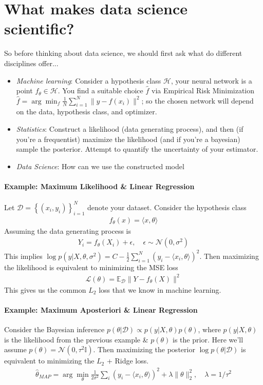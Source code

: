 \section{What makes data science scientific?}
So before thinking about data science, we should first ask what do different disciplines offer...
\begin{itemize}
	\item \emph{Machine learning}: Consider a hypothesis class $\mathcal H$, your neural network is a point $f_\theta \in \mathcal H$. You find a suitable choice $\hat f$ via Empirical Risk Minimization $\hat f = \arg \min_{f}\frac{1}{N} \sum_{i=1}^N \| y - f(x_i)\|^2$; so the chosen network will depend on the data, hypothesis class, and optimizer.
	\item \emph{Statistics}: Construct a likelihood (data generating process), and then (if you're a frequentist) maximize the likelihood (and if you're a bayesian) sample the posterior. Attempt to quantify the uncertainty of your estimator.
	\item \emph{Data Science}: How can we use the constructed model 
\end{itemize}

\paragraph{Example: Maximum Likelihood \& Linear Regression}
Let $\mathcal D = \left\{ (x_i, y_i) \right\}_{i=1}^N$ denote your dataset. Consider the hypothesis class
\begin{align}
	f_\theta(x) = \langle x , \theta\rangle
\end{align}
Assuming the data generating process is
\begin{align}
	Y_i = f_\theta(X_i) + \epsilon, \quad \epsilon \sim \mathcal N(0, \sigma^2)
\end{align}
This implies $\log p(y| X, \theta, \sigma^2) = C - \frac{1}{2} \sum_{i=1}^N(y_i - \langle x_i, \theta\rangle)^2$. Then maximizing the likelihood is equivalent to minimizing the MSE loss
\begin{align}
	\mathcal L(\theta) = \mathbb E_{\mathcal D} \| Y - f_\theta(X)\|^2
\end{align}
This gives us the common $L_2$ loss that we know in machine learning.

\paragraph{Example: Maximum Aposteriori \& Linear Regression}
Consider the Bayesian inference $p(\theta | \mathcal D) \propto p(y| X, \theta) p(\theta)$, where $p(y|X, \theta)$ is the likelihood from the previous example \& $p(\theta)$ is the prior. Here we'll assume $p(\theta) = \mathcal N(0, \tau^2 \mathbb I)$. Then maximizing the posterior $\log p(\theta | \mathcal D)$ is equivalent to minimizing the $L_2$ + Ridge loss.
\begin{align}
	\hat \theta_{MAP} = \arg \min_\theta \frac{1}{2 \sigma^2}\sum_i (y_i - \langle x_i, \theta\rangle)^2 + \lambda \| \theta\|_2^2, \quad \lambda = 1/\tau^2
\end{align}

